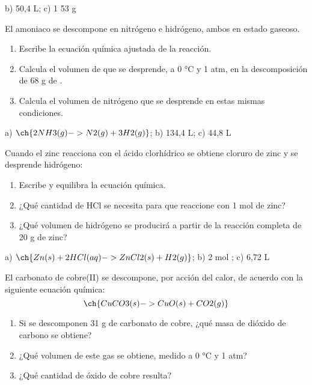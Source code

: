 \documentclass[
]{article}
\providecommand{\tightlist}{%
  \setlength{\itemsep}{0pt}\setlength{\parskip}{0pt}}
\begin{document}
\begin{solution}b) 50,4 L; c) 1 53 g\end{solution}

\begin{exercise}[tags=OXF16] El amoniaco se descompone en nitrógeno e
hidrógeno, ambos en estado gaseoso.

\begin{enumerate}
\def\labelenumi{\alph{enumi})}
\tightlist
\item
  Escribe la ecuación química ajustada de la reacción.
\item
  Calcula el volumen de  que se desprende, a 0 °C y 1 atm, en la
  descomposición de 68 g de .
\item
  Calcula el volumen de nitrógeno que se desprende en estas mismas
  condiciones.
\end{enumerate}

\end{exercise}

\begin{solution}a) \(\ch{2 NH3(g) -> N2(g) + 3 H2(g)}\); b) 134,4 L; c)
44,8 L\end{solution}

\begin{exercise}[tags=OXF16] Cuando el zinc reacciona con el ácido
clorhídrico se obtiene cloruro de zinc y se desprende hidrógeno:

\begin{enumerate}
\def\labelenumi{\alph{enumi})}
\tightlist
\item
  Escribe y equilibra la ecuación química.
\item
  ¿Qué cantidad de HCl se necesita para que reaccione con 1 mol de zinc?
\item
  ¿Qué volumen de hidrógeno se producirá a partir de la reacción
  completa de 20 g de zinc?
\end{enumerate}

\end{exercise}

\begin{solution}a) \(\ch{Zn(s) + 2 HCl(aq) -> ZnCl2(s) + H2(g)}\); b) 2
mol ; c) 6,72 L\end{solution}

\begin{exercise}[tags=OXF16] El carbonato de cobre(II) se descompone,
por acción del calor, de acuerdo con la siguiente ecuación química:
\[\ch{CuCO3(s) -> CuO(s) + CO2(g)}\]

\begin{enumerate}
\def\labelenumi{\alph{enumi})}
\tightlist
\item
  Si se descomponen 31 g de carbonato de cobre, ¿qué masa de dióxido de
  carbono se obtiene?
\item
  ¿Qué volumen de este gas se obtiene, medido a 0 °C y 1 atm?
\item
  ¿Qué cantidad de óxido de cobre resulta?
\end{enumerate}

\end{exercise}
\end{document}
